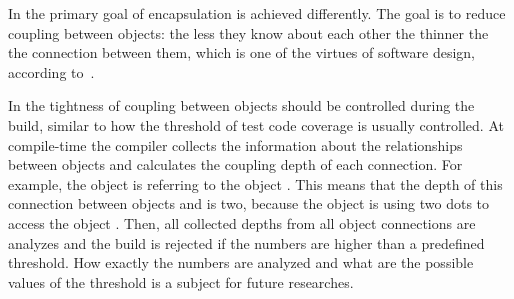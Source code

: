 In \eolang{} the primary goal of encapsulation is achieved differently.
The goal is to reduce coupling between objects:
the less they know about each other the thinner the
the connection between them, which is one of the virtues of
software design, according to~\citet{yourdon1979structured}.

In \eolang{} the tightness of coupling between objects should be controlled
during the build, similar to how the threshold of test code coverage is
usually controlled. At compile-time the compiler collects the information
about the relationships between objects and calculates the coupling depth of each connection.
For example, the object  is referring to the object
. This means that the depth of this connection between objects
 and  is two, because the object  is using
two dots to access the object . Then, all collected depths from
all object connections are analyzes and the build is rejected if the numbers
are higher than a predefined threshold. How exactly the numbers are analyzed
and what are the possible values of the threshold is a subject for future
researches.
